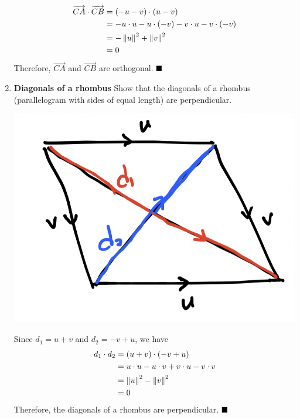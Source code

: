 \begin{enumerate}
\begin{align*}
              \overrightarrow{C A} \cdot \overrightarrow{C B} & = (-u - v) \cdot (u - v)                               \\
                                                              & = -u \cdot u - u \cdot (-v) - v \cdot u - v \cdot (-v) \\
                                                              & = -\left\lVert u\right\rVert^2 + \left\lVert v\right\rVert^2                             \\
                                                              & = 0
          \end{align*}
          Therefore, $\overrightarrow{C A}$ and $\overrightarrow{C B}$ are orthogonal. $\hfill\blacksquare$

    \item \textbf{Diagonals of a rhombus} Show that the diagonals of a rhombus (parallelogram with
          sides of equal length) are perpendicular.
          \sol{}
          \begin{center}
              \includegraphics[scale=0.4]{assets/thomas12.3q21.png}
          \end{center}
          Since $d_1 = u + v$ and $d_2 = -v + u$, we have
          \begin{align*}
              d_1 \cdot d_2 & = (u + v) \cdot (-v + u)                        \\
                            & = u \cdot u - u \cdot v + v \cdot u - v \cdot v \\
                            & = \left\lVert u\right\rVert^2 - \left\lVert v\right\rVert^2                       \\
                            & = 0
          \end{align*}
          Therefore, the diagonals of a rhombus are perpendicular. $\hfill\blacksquare$


\end{enumerate}
